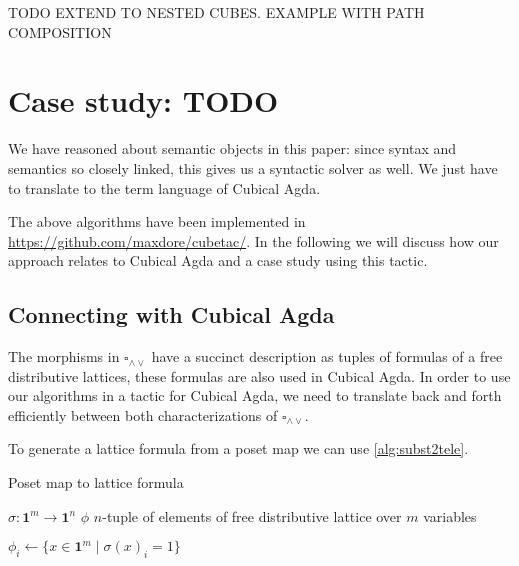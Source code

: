 \documentclass{llncs}
\newcommand{\todo}[1]{
  \begin{tcolorbox}
    TODO {#1} 
  \end{tcolorbox}
}
\newcommand{\join}{\wedge}
\newcommand{\meet}{\vee}
\newcommand{\dedekind}{\square_{\join \meet}}
\newcommand{\pint}[1]{\mathbf{1}^{#1}}
\begin{document}
\todo{EXTEND TO NESTED CUBES. EXAMPLE WITH PATH COMPOSITION}






\section{Case study: TODO}
\label{sec:cubicalagda}

We have reasoned about semantic objects in this paper: since syntax and semantics so
closely linked, this gives us a syntactic solver as well. We just have to
translate to the term language of Cubical Agda.

The above algorithms have been implemented in
\url{https://github.com/maxdore/cubetac/}. In the following we will discuss how
our approach relates to Cubical Agda and a case study using this tactic.




\subsection{Connecting with Cubical Agda}

The morphisms in $\dedekind$ have a succinct description as tuples of formulas
of a free distributive lattices, these formulas are also used in Cubical Agda.
In order to use our algorithms in a tactic for Cubical Agda, we need to
translate back and forth efficiently between both characterizations of $\dedekind$.

To generate a lattice formula from a poset map we can use \autoref{alg:subst2tele}.

\begin{algorithm}[H]
  \caption{Poset map to lattice formula}\label{alg:subst2tele}
  \begin{algorithmic}
    \Require $\sigma : \pint{m} \to \pint{n}$
    \Ensure $\phi$ $n$-tuple of elements of free distributive lattice over $m$ variables

      \State $\phi_i \gets \{ x \in \pint{m} \mid \sigma(x)_i = 1 \}$
      \Comment{$\mathcal{O}(2^m)$ many elements in $\pint{m}$}
    \EndFor
    \State {}
    \EndProcedure
  \end{algorithmic}
\end{algorithm}
\end{document}
